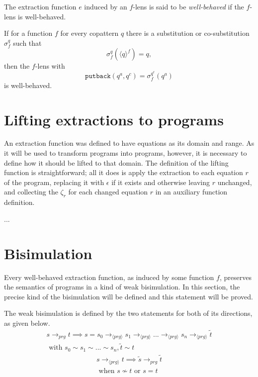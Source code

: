 \begin{definition}
The extraction function $e$ induced by an $f$-lens is said to be \textit{well-behaved} if the $f$-lens is well-behaved.
\end{definition}

\begin{lemma}
If for a function $f$ for every copattern $q$ there is a substitution or co-substitution $\sigma^q_f$ such that
\[
\sigma^q_f(\langle q \rangle^f) = q,
\]
then the $f$-lens with
\[
\mathtt{putback}(q^a, q^c) = \sigma^{q^c}_f(q^a)
\]
is well-behaved.
\end{lemma}

\section{Lifting extractions to programs}

An extraction function was defined to have equations as its domain and range. As it will be used to transform programs into programs, however, it is necessary to define how it should be lifted to that domain. The definition of the lifting function is straightforward; all it does is apply the extraction to each equation $r$ of the program, replacing it with $\epsilon$ if it exists and otherwise leaving $r$ unchanged, and collecting the $\zeta_r$ for each changed equation $r$ in an auxiliary function definition.

...

\section{Bisimulation}

Every well-behaved extraction function, as induced by some function $f$, preserves the semantics of programs in a kind of weak bisimulation. In this section, the precise kind of the bisimulation will be defined and this statement will be proved.

The weak bisimulation is defined by the two statements for both of its directions, as given below.
\begin{multline}
s \longrightarrow_{prg} t \implies s = s_0 \longrightarrow_{\langle prg \rangle} s_1 \longrightarrow_{\langle prg \rangle} ... \longrightarrow_{\langle prg \rangle} s_n \longrightarrow_{\langle prg \rangle} \widetilde{t}\\
\text{ with } s_0 \sim s_1 \sim ... \sim s_n, \widetilde{t} \sim t
\end{multline}
\begin{multline}
s \longrightarrow_{\langle prg \rangle} t \implies \widetilde{s} \longrightarrow_{prg} \widetilde{t}\\
\text{ when } s \not\sim t \text{ or } s = t
\end{multline}

